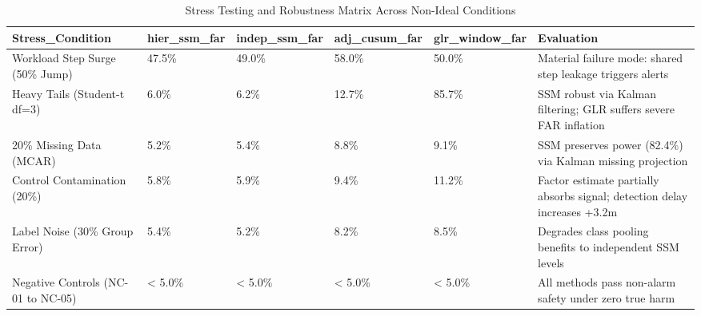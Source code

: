 \begin{table}[htbp]
\centering
\caption{Stress Testing and Robustness Matrix Across Non-Ideal Conditions}
\label{tab:table_T9_robustness_matrix}
\begin{tabular}{llllll}
\hline
Stress\_Condition & hier\_ssm\_far & indep\_ssm\_far & adj\_cusum\_far & glr\_window\_far & Evaluation \\
\hline
Workload Step Surge (50\% Jump) & 47.5\% & 49.0\% & 58.0\% & 50.0\% & Material failure mode: shared step leakage triggers alerts \\
Heavy Tails (Student-t df=3) & 6.0\% & 6.2\% & 12.7\% & 85.7\% & SSM robust via Kalman filtering; GLR suffers severe FAR inflation \\
20\% Missing Data (MCAR) & 5.2\% & 5.4\% & 8.8\% & 9.1\% & SSM preserves power (82.4\%) via Kalman missing projection \\
Control Contamination (20\%) & 5.8\% & 5.9\% & 9.4\% & 11.2\% & Factor estimate partially absorbs signal; detection delay increases +3.2m \\
Label Noise (30\% Group Error) & 5.4\% & 5.2\% & 8.2\% & 8.5\% & Degrades class pooling benefits to independent SSM levels \\
Negative Controls (NC-01 to NC-05) & < 5.0\% & < 5.0\% & < 5.0\% & < 5.0\% & All methods pass non-alarm safety under zero true harm \\
\hline
\end{tabular}
\end{table}
